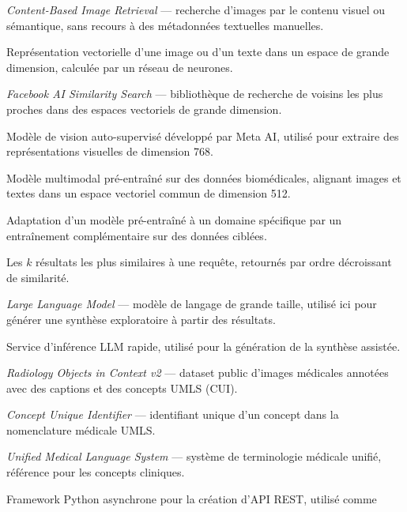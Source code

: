 \documentclass[12pt,a4paper]{article}
\begin{document}
\begin{description}[leftmargin=7em, style=sameline]
  \item[CBIR]       \textit{Content-Based Image Retrieval} --- recherche d'images
                    par le contenu visuel ou sémantique, sans recours à des métadonnées
                    textuelles manuelles.
  \item[Embedding]  Représentation vectorielle d'une image ou d'un texte dans un espace
                    de grande dimension, calculée par un réseau de neurones.
  \item[FAISS]      \textit{Facebook AI Similarity Search} --- bibliothèque de recherche
                    de voisins les plus proches dans des espaces vectoriels de grande dimension.
  \item[DINOv2]     Modèle de vision auto-supervisé développé par Meta AI, utilisé pour
                    extraire des représentations visuelles de dimension 768.
  \item[BioMedCLIP] Modèle multimodal pré-entraîné sur des données biomédicales, alignant
                    images et textes dans un espace vectoriel commun de dimension 512.
  \item[Fine-tuning] Adaptation d'un modèle pré-entraîné à un domaine spécifique par un
                    entraînement complémentaire sur des données ciblées.
  \item[Top-k]      Les $k$ résultats les plus similaires à une requête, retournés par
                    ordre décroissant de similarité.
  \item[LLM]        \textit{Large Language Model} --- modèle de langage de grande taille,
                    utilisé ici pour générer une synthèse exploratoire à partir des résultats.
  \item[Groq]       Service d'inférence LLM rapide, utilisé pour la génération de la
                    synthèse assistée.
  \item[ROCOv2]     \textit{Radiology Objects in Context v2} --- dataset public d'images
                    médicales annotées avec des captions et des concepts UMLS (CUI).
  \item[CUI]        \textit{Concept Unique Identifier} --- identifiant unique d'un concept
                    dans la nomenclature médicale UMLS.
  \item[UMLS]       \textit{Unified Medical Language System} --- système de terminologie
                    médicale unifié, référence pour les concepts cliniques.
  \item[FastAPI]    Framework Python asynchrone pour la création d'API REST, utilisé comme

\end{description}
\end{document}
